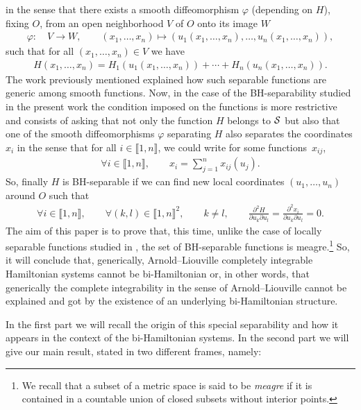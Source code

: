 \documentclass[10pt,a4paper]{amsart}
\numberwithin{equation}{section}
\begin{document}
in the sense that there exists a smooth diffeomorphism $\varphi$ (depending on $H$), fixing $O$, from an open neighborhood $V$ of $O$ onto its image $W$
\begin{gather*}
\varphi\colon\quad V\to W,\qquad
(x_1,\dots,x_n)\mapsto(u_1(x_1,\dots,x_n),\dots,u_n(x_1,\dots,x_n)),
\end{gather*}
such that for all $(x_1,\dots,x_n)\in V$ we have
\begin{gather*}
H(x_1,\dots,x_n)=H_1(u_1(x_1,\dots,x_n))+\cdots+H_n(u_n(x_1,\dots,x_n)).
\end{gather*}
The work previously mentioned explained how such separable functions are generic among smooth functions.
Now, in the case of the BH-separability studied in the present work the condition imposed on the functions is more restrictive and consists of asking that not only the function $H$ belongs to ${\cal S}$ but also that one of the smooth diffeomorphisms $\varphi$ separating $H$ also separates the coordinates $x_i$ in the sense that for all $i\in\llbracket 1,n\rrbracket$, we could write for some functions~$x_{ij}$,
\begin{gather*}
\forall i\in\llbracket 1,n\rrbracket,\qquad
x_i=\sum_{j=1}^nx_{ij}(u_j).
\end{gather*}
So, finally $H$ is BH-separable if we can find new local coordinates $(u_1,\dots,u_n)$ around $O$ such that
\begin{gather*}
\forall i\in\llbracket 1,n\rrbracket,\qquad \forall (k,l)\in\llbracket 1,n\rrbracket^2, \qquad k\not=l,\qquad \frac{\partial^2 H}{\partial u_k\partial u_l}= \frac{\partial^2 x_i}{\partial u_k\partial u_l}=0.
\end{gather*}
The aim of this paper is to prove that, this time, unlike the case of locally separable functions studied in \cite{BouBr}, the set of BH-separable functions is meagre.\footnote{We recall that a subset of a metric space is said to be {\it meagre} if it is contained in a countable union of closed subsets without interior points.} So, it will conclude that, generically, Arnold--Liouville completely integrable Hamiltonian systems cannot be bi-Hamiltonian or, in other words, that generically the complete integrability in the sense of Arnold--Liouville cannot be explained and got by the existence of an underlying bi-Hamiltonian structure.

In the first part we will recall the origin of this special separability and how it appears in the context of the bi-Hamiltonian systems. In the second part we will give our main result, stated in two different frames, namely:
\end{document}
